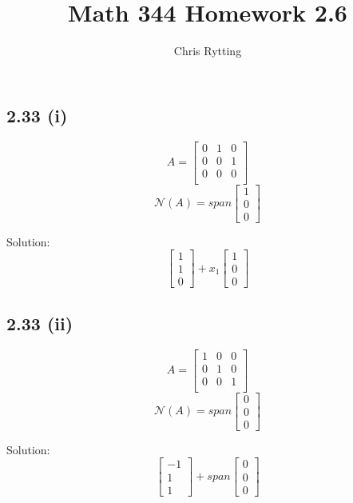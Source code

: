 \documentclass[letterpaper,12pt]{article}
\theoremstyle{definition}
\begin{document}
\title{Math 344 Homework 2.6}
\author{Chris Rytting}
\maketitle

\subsection*{2.33 (i)}

\[A =
\begin{bmatrix}
    0 & 1 & 0 \\
    0 & 0 & 1 \\
    0 & 0 & 0 \\
\end{bmatrix}
\]
\[ \mathscr{N} (A) = span 
\begin{bmatrix}
    1 \\
    0\\
    0
\end{bmatrix}
\]

Solution:
\[
\begin{bmatrix}
    1\\1\\0
\end{bmatrix}
+
x_1
\begin{bmatrix}
    1\\0\\0
\end{bmatrix}
\]

\subsection*{2.33 (ii)}

\[A =
\begin{bmatrix}
    1 & 0 & 0 \\
    0 & 1 & 0 \\
    0 & 0 & 1 \\
\end{bmatrix}
\]
\[ \mathscr{N} (A) = span 
\begin{bmatrix}
    0 \\
    0\\
    0
\end{bmatrix}
\]

Solution:
\[
\begin{bmatrix}
    -1\\1\\1
\end{bmatrix}
+
span
\begin{bmatrix}
    0\\0\\0
\end{bmatrix}
\]
\end{document}
